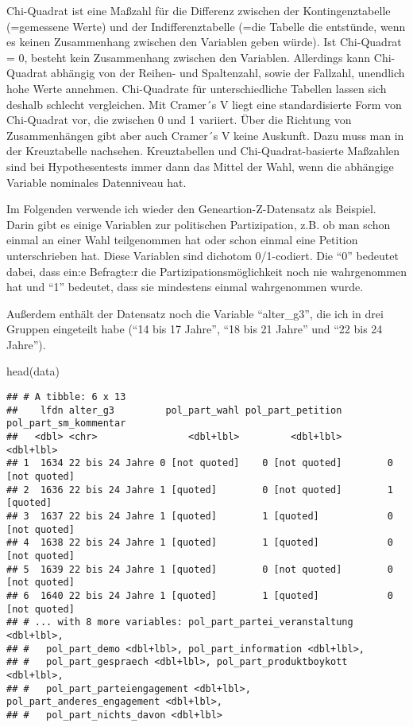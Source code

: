 \documentclass[
]{book}
\newenvironment{Shaded}{\begin{snugshade}}{\end{snugshade}}
\newcommand{\FunctionTok}[1]{\textcolor[rgb]{0.00,0.00,0.00}{#1}}
\newcommand{\NormalTok}[1]{#1}
\begin{document}
Chi-Quadrat ist eine Maßzahl für die Differenz zwischen der Kontingenztabelle (=gemessene Werte) und der Indifferenztabelle (=die Tabelle die entstünde, wenn es keinen Zusammenhang zwischen den Variablen geben würde). Ist Chi-Quadrat = 0, besteht kein Zusammenhang zwischen den Variablen. Allerdings kann Chi-Quadrat abhängig von der Reihen- und Spaltenzahl, sowie der Fallzahl, unendlich hohe Werte annehmen. Chi-Quadrate für unterschiedliche Tabellen lassen sich deshalb schlecht vergleichen. Mit Cramer´s V liegt eine standardisierte Form von Chi-Quadrat vor, die zwischen 0 und 1 variiert. Über die Richtung von Zusammenhängen gibt aber auch Cramer´s V keine Auskunft. Dazu muss man in der Kreuztabelle nachsehen. Kreuztabellen und Chi-Quadrat-basierte Maßzahlen sind bei Hypothesentests immer dann das Mittel der Wahl, wenn die abhängige Variable nominales Datenniveau hat.

Im Folgenden verwende ich wieder den Geneartion-Z-Datensatz als Beispiel. Darin gibt es einige Variablen zur politischen Partizipation, z.B. ob man schon einmal an einer Wahl teilgenommen hat oder schon einmal eine Petition unterschrieben hat. Diese Variablen sind dichotom 0/1-codiert. Die ``0'' bedeutet dabei, dass ein:e Befragte:r die Partizipationsmöglichkeit noch nie wahrgenommen hat und ``1'' bedeutet, dass sie mindestens einmal wahrgenommen wurde.

Außerdem enthält der Datensatz noch die Variable ``alter\_g3'', die ich in drei Gruppen eingeteilt habe (``14 bis 17 Jahre'', ``18 bis 21 Jahre'' und ``22 bis 24 Jahre'').

\begin{Shaded}
\begin{Highlighting}[]
\FunctionTok{head}\NormalTok{(data)}
\end{Highlighting}
\end{Shaded}

\begin{verbatim}
## # A tibble: 6 x 13
##    lfdn alter_g3         pol_part_wahl pol_part_petition pol_part_sm_kommentar
##   <dbl> <chr>                <dbl+lbl>         <dbl+lbl>             <dbl+lbl>
## 1  1634 22 bis 24 Jahre 0 [not quoted]    0 [not quoted]        0 [not quoted]
## 2  1636 22 bis 24 Jahre 1 [quoted]        0 [not quoted]        1 [quoted]    
## 3  1637 22 bis 24 Jahre 1 [quoted]        1 [quoted]            0 [not quoted]
## 4  1638 22 bis 24 Jahre 1 [quoted]        1 [quoted]            0 [not quoted]
## 5  1639 22 bis 24 Jahre 1 [quoted]        0 [not quoted]        0 [not quoted]
## 6  1640 22 bis 24 Jahre 1 [quoted]        1 [quoted]            0 [not quoted]
## # ... with 8 more variables: pol_part_partei_veranstaltung <dbl+lbl>,
## #   pol_part_demo <dbl+lbl>, pol_part_information <dbl+lbl>,
## #   pol_part_gespraech <dbl+lbl>, pol_part_produktboykott <dbl+lbl>,
## #   pol_part_parteiengagement <dbl+lbl>, pol_part_anderes_engagement <dbl+lbl>,
## #   pol_part_nichts_davon <dbl+lbl>
\end{verbatim}
\end{document}
